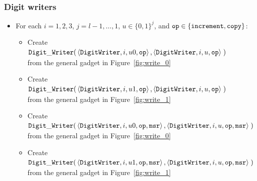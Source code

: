 \subsubsection{ Digit writers }

\begin{itemize}

    \item For each $i = 1,2,3$,
                   $j = l-1,\ldots,1$,
                   $u \in \{0, 1\}^j$, and
                   ${\tt op} \in \{{\tt increment}, {\tt copy} \}$:
        \begin{itemize}
        \item Create
        $\begin{aligned}[t]
            {\tt Digit\_Writer}(& \left\langle {\tt DigitWriter}, i, u0, {\tt op} \right\rangle,
                       \left\langle {\tt DigitWriter},  i, u, {\tt op} \right\rangle \;)
        \end{aligned}$ \\ from the general gadget in Figure~\ref{fig:write_0}

        \item Create
        $\begin{aligned}[t]
            {\tt Digit\_Writer}(& \left\langle {\tt DigitWriter},    i,  u1, {\tt op} \right\rangle,
                       \left\langle {\tt DigitWriter}, i,  u,  {\tt op} \right\rangle \;)
        \end{aligned}$ \\ from the general gadget in Figure~\ref{fig:write_1}


        \item Create
        $\begin{aligned}[t]
            {\tt Digit\_Writer}(& \left\langle {\tt DigitWriter}, i, u0, {\tt op}, {\tt msr} \right\rangle,
                       \left\langle {\tt DigitWriter},  i, u, {\tt op}, {\tt msr} \right\rangle \;)
        \end{aligned}$ \\ from the general gadget in Figure~\ref{fig:write_0}

        \item Create
        $\begin{aligned}[t]
            {\tt Digit\_Writer}(& \left\langle {\tt DigitWriter},    i,  u1, {\tt op}, {\tt msr} \right\rangle,
                       \left\langle {\tt DigitWriter}, i,  u,  {\tt op}, {\tt msr} \right\rangle \;)
        \end{aligned}$ \\ from the general gadget in Figure~\ref{fig:write_1}


\end{itemize}
\end{itemize}
